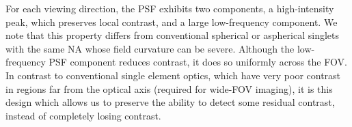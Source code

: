  
 
For each viewing direction, the PSF exhibits two components, a
high-intensity peak, which preserves local contrast, and a large
low-frequency component. We note that this property differs from 
 conventional spherical or aspherical singlets with the same
NA whose field curvature can be severe.  Although the low-frequency
PSF component reduces contrast, it does so
uniformly across the FOV.  In contrast to conventional single
  element optics, which have very poor contrast in regions far from
  the optical axis (required for wide-FOV imaging), it
  is this design which allows us to preserve the ability to detect
  some residual contrast, instead of completely losing contrast. 
%


